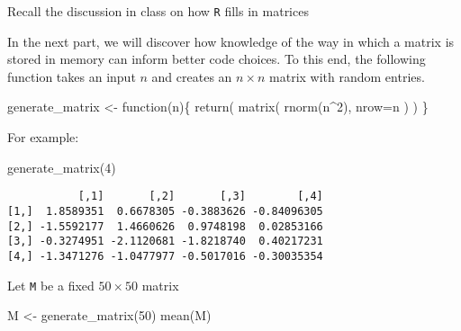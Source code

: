 \documentclass[
  letterpaper,
  DIV=11,
  numbers=noendperiod]{scrartcl}
\newenvironment{Shaded}{\begin{snugshade}}{\end{snugshade}}
\newcommand{\AttributeTok}[1]{\textcolor[rgb]{0.40,0.45,0.13}{#1}}
\newcommand{\ControlFlowTok}[1]{\textcolor[rgb]{0.00,0.23,0.31}{#1}}
\newcommand{\DecValTok}[1]{\textcolor[rgb]{0.68,0.00,0.00}{#1}}
\newcommand{\FunctionTok}[1]{\textcolor[rgb]{0.28,0.35,0.67}{#1}}
\newcommand{\NormalTok}[1]{\textcolor[rgb]{0.00,0.23,0.31}{#1}}
\newcommand{\OtherTok}[1]{\textcolor[rgb]{0.00,0.23,0.31}{#1}}
\newcommand{\SpecialCharTok}[1]{\textcolor[rgb]{0.37,0.37,0.37}{#1}}
\begin{document}
\begin{tcolorbox}[enhanced jigsaw, opacityback=0, rightrule=.15mm, leftrule=.75mm, colframe=quarto-callout-warning-color-frame, bottomrule=.15mm, opacitybacktitle=0.6, colbacktitle=quarto-callout-warning-color!10!white, toptitle=1mm, coltitle=black, bottomtitle=1mm, left=2mm, breakable, arc=.35mm, titlerule=0mm, title=\textcolor{quarto-callout-warning-color}{\faExclamationTriangle}\hspace{0.5em}{Tip}, toprule=.15mm, colback=white]

Recall the discussion in class on how \texttt{R} fills in matrices

\end{tcolorbox}

In the next part, we will discover how knowledge of the way in which a
matrix is stored in memory can inform better code choices. To this end,
the following function takes an input \(n\) and creates an
\(n \times n\) matrix with random entries.

\begin{Shaded}
\begin{Highlighting}[]
\NormalTok{generate\_matrix }\OtherTok{\textless{}{-}} \ControlFlowTok{function}\NormalTok{(n)\{}
    \FunctionTok{return}\NormalTok{(}
        \FunctionTok{matrix}\NormalTok{(}
            \FunctionTok{rnorm}\NormalTok{(n}\SpecialCharTok{\^{}}\DecValTok{2}\NormalTok{),}
            \AttributeTok{nrow=}\NormalTok{n}
\NormalTok{        )}
\NormalTok{    )}
\NormalTok{\}}
\end{Highlighting}
\end{Shaded}

For example:

\begin{Shaded}
\begin{Highlighting}[]
\FunctionTok{generate\_matrix}\NormalTok{(}\DecValTok{4}\NormalTok{)}
\end{Highlighting}
\end{Shaded}

\begin{verbatim}
           [,1]       [,2]       [,3]        [,4]
[1,]  1.8589351  0.6678305 -0.3883626 -0.84096305
[2,] -1.5592177  1.4660626  0.9748198  0.02853166
[3,] -0.3274951 -2.1120681 -1.8218740  0.40217231
[4,] -1.3471276 -1.0477977 -0.5017016 -0.30035354
\end{verbatim}

Let \texttt{M} be a fixed \(50 \times 50\) matrix

\begin{Shaded}
\begin{Highlighting}[]
\NormalTok{M }\OtherTok{\textless{}{-}} \FunctionTok{generate\_matrix}\NormalTok{(}\DecValTok{50}\NormalTok{)}
\FunctionTok{mean}\NormalTok{(M)}
\end{Highlighting}
\end{Shaded}
\end{document}
